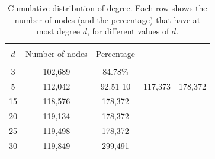 \documentclass[11pt, english]{article}
\begin{document}
\begin{multicols}{2}
\begin{table}
	\caption{Cumulative distribution of degree. Each row shows the number of nodes (and the percentage) that have at most degree $d$, for different values of $d$.}
	\label{tab:network-details}
	\centering
	\begin{tabular}{ccc}
		\hline\hline
		\\[-1.5ex]
		$d$		&	Number of nodes	&	Percentage	\\[0.5ex]\hline
		\\[-1.5ex]
		3		&	102,689			&	84.78\%		\\[0.2ex]
		5		&	112,042			&	92.51%
		10		&	117,373			&	178,372		\\[0.2ex]
		15		&	118,576			&	178,372		\\[0.2ex]
		20		&	119,134			&	178,372		\\[0.2ex]
		25		&	119,498			&	178,372		\\[0.2ex]
		30		&	119,849			&	299,491		\\[0.5ex]
		\hline\hline
	\end{tabular}
\end{table}

\end{multicols}
\end{document}
